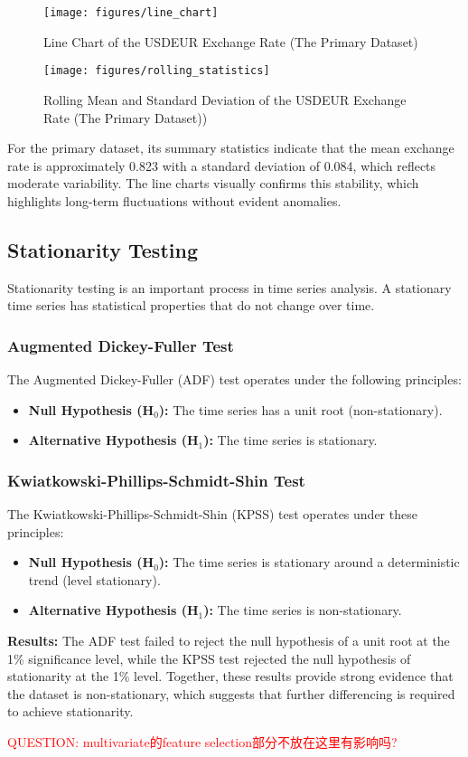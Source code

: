 \begin{figure}[H]
\centering
\texttt{[image: figures/line\_chart]}
\caption{Line Chart of the USDEUR Exchange Rate (The Primary Dataset)}
\label{fig:line_chart}
\end{figure}

\begin{figure}[H]
\centering
\texttt{[image: figures/rolling\_statistics]}
\caption{Rolling Mean and Standard Deviation of the USDEUR Exchange Rate (The Primary Dataset))}
\label{fig:rolling_statistics}
\end{figure}

For the primary dataset, its summary statistics indicate that the mean exchange rate is approximately 0.823 with a standard deviation of 0.084, which reflects moderate variability. The line charts visually confirms this stability, which highlights long-term fluctuations without evident anomalies.

\subsection{Stationarity Testing}
Stationarity testing is an important process in time series analysis. A stationary time series has statistical properties that do not change over time.

\subsubsection{Augmented Dickey-Fuller Test}
The Augmented Dickey-Fuller (ADF) test operates under the following principles:
\begin{itemize}
    \item \textbf{Null Hypothesis (H\(_0\)):} The time series has a unit root (non-stationary).
    \item \textbf{Alternative Hypothesis (H\(_1\)):} The time series is stationary.
\end{itemize}


\subsubsection{Kwiatkowski-Phillips-Schmidt-Shin Test}
The Kwiatkowski-Phillips-Schmidt-Shin (KPSS) test operates under these principles:
\begin{itemize}
    \item \textbf{Null Hypothesis (H\(_0\)):} The time series is stationary around a deterministic trend (level stationary).
    \item \textbf{Alternative Hypothesis (H\(_1\)):} The time series is non-stationary.
\end{itemize}

\textbf{Results:} The ADF test failed to reject the null hypothesis of a unit root at the 1\% significance level, while the KPSS test rejected the null hypothesis of stationarity at the 1\% level. Together, these results provide strong evidence that the dataset is non-stationary, which suggests that further differencing is required to achieve stationarity.

\textcolor{red}{QUESTION: multivariate的feature selection部分不放在这里有影响吗?}
